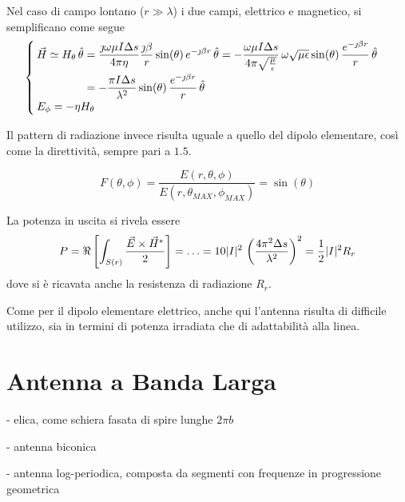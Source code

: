 Nel caso di campo lontano ($r \gg \lambda$) i due campi, elettrico e magnetico, si semplificano come segue
\begin{equation}
	\begin{cases}
		\begin{split}
			\vec{H}
			\simeq H_{\theta} \,\hat{\theta}
			& = \frac{\jmath \omega \mu I \Delta s}{4 \pi \eta} \frac{\jmath \beta}{r} \sin (\theta) \, e^{-\jmath \beta r} \,\hat{\theta}
			= -\frac{\omega \mu I \Delta s}{4 \pi \sqrt{\frac{\mu}{\epsilon}}}
			\, \omega \sqrt{\mu \epsilon} \sin (\theta)
			\, \frac{e^{-\jmath \beta r}}{r} \,\hat{\theta} \\
			& = -\frac{\pi I \Delta s}{\lambda^2} \sin (\theta)\, \frac{e^{-\jmath \beta r}}{r} \,\hat{\theta}
		\end{split} \\
		E_{\phi} = - \eta H_{\theta}
	\end{cases}
\end{equation}

Il pattern di radiazione invece risulta uguale a quello del dipolo elementare, così come la direttività, sempre pari a $1.5$.

\begin{equation}
	F(\theta, \phi)
	= \frac{E(r, \theta, \phi)}{E(r, \theta_{MAX}, \phi_{MAX})} = \sin(\theta)
\end{equation}

La potenza in uscita si rivela essere
\begin{equation*}
	P
	= \Re \left[
		\int_{S(r)} \frac{\vec{E} \times \vec{H}^*}{2}
	\right]
	= \ldots
	= 10 |I|^2 \, \left(
		\frac{4\pi^2 \Delta s}{\lambda^2}
	\right)^2
	= \frac{1}{2} |I|^2 R_r
\end{equation*}
dove si è ricavata anche la resistenza di radiazione $R_r$.

Come per il dipolo elementare elettrico, anche qui l'antenna risulta di difficile utilizzo, sia in termini di potenza irradiata che di adattabilità alla linea.

\section{Antenna a Banda Larga}
- elica, come schiera fasata di spire lunghe $2\pi b$

- antenna biconica

- antenna log-periodica, composta da segmenti con frequenze in progressione geometrica

